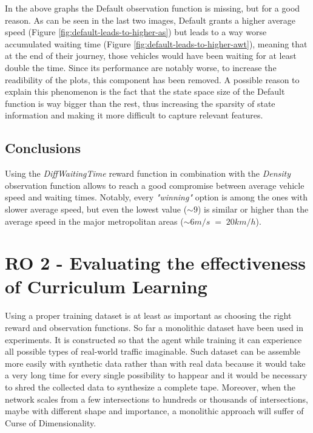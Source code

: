 In the above graphs the Default observation function is missing, but for a good reason.
As can be seen in the last two images, Default grants a higher average speed (Figure \ref{fig:default-leads-to-higher-as}) but leads to a way worse accumulated waiting time (Figure \ref{fig:default-leads-to-higher-awt}), meaning that at the end of their journey, those vehicles would have been waiting for at least double the time.
Since its performance are notably worse, to increase the readibility of the plots, this component has been removed.
A possible reason to explain this phenomenon is the fact that the state space size of the Default function is way bigger than the rest, thus increasing the sparsity of state information and making it more difficult to capture relevant features.


\subsection{Conclusions}

Using the \textit{DiffWaitingTime} reward function in combination with the \textit{Density} observation function allows to reach a good compromise between average vehicle speed and waiting times.
Notably, every \textit{"winning"} option is among the ones with slower average speed, but even the lowest value ($\sim9$) is similar or higher than the average speed in the major metropolitan areas ($\sim 6 m/s \; = \; 20 km/h$).

\section{RO 2 - Evaluating the effectiveness of Curriculum Learning}

Using a proper training dataset is at least as important as choosing the right reward and observation functions.
So far a monolithic dataset have been used in experiments.
It is constructed so that the agent while training it can experience all possible types of real-world traffic imaginable.
Such dataset can be assemble more easily with synthetic data rather than with real data because it would take a very long time for every single possibility to happear and it would be necessary to shred the collected data to synthesize a complete tape.
Moreover, when the network scales from a few intersections to hundreds or thousands of intersections, maybe with different shape and importance, a monolithic approach will suffer of Curse of Dimensionality.

